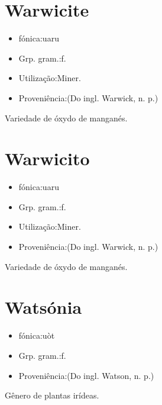 \documentclass{article}
\begin{document}
\section{Warwicite}
\begin{itemize}
\item {fónica:uaru}
\end{itemize}
\begin{itemize}
\item {Grp. gram.:f.}
\end{itemize}
\begin{itemize}
\item {Utilização:Miner.}
\end{itemize}
\begin{itemize}
\item {Proveniência:(Do ingl. \textunderscore Warwick\textunderscore , n. p.)}
\end{itemize}
Variedade de óxydo de manganés.
\section{Warwicito}
\begin{itemize}
\item {fónica:uaru}
\end{itemize}
\begin{itemize}
\item {Grp. gram.:f.}
\end{itemize}
\begin{itemize}
\item {Utilização:Miner.}
\end{itemize}
\begin{itemize}
\item {Proveniência:(Do ingl. \textunderscore Warwick\textunderscore , n. p.)}
\end{itemize}
Variedade de óxydo de manganés.
\section{Watsónia}
\begin{itemize}
\item {fónica:uòt}
\end{itemize}
\begin{itemize}
\item {Grp. gram.:f.}
\end{itemize}
\begin{itemize}
\item {Proveniência:(Do ingl. \textunderscore Watson\textunderscore , n. p.)}
\end{itemize}
Gênero de plantas irídeas.
\end{document}
